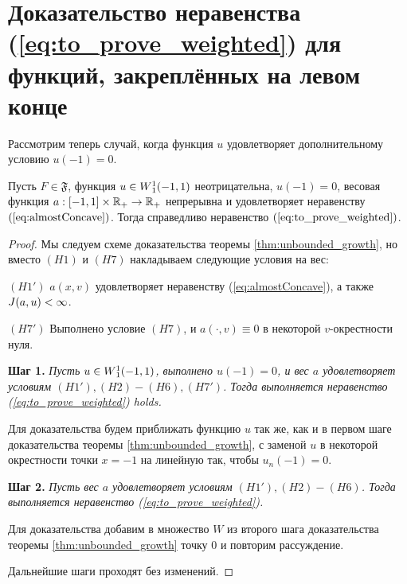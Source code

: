 \section{Доказательство неравенства (\ref{eq:to_prove_weighted}) для функций, закреплённых на левом конце}

Рассмотрим теперь случай, когда функция $u$ удовлетворяет дополнительному условию $u(-1) = 0$.
\begin{thm}
Пусть $F \in \mathfrak{F}$, функция $u \in W{}_1^1(-1, 1)$ неотрицательна, $u(-1) = 0$,
весовая функция $a: [-1, 1] \times \mathbb R_+ \to \mathbb R_+$ непрерывна и удовлетворяет неравенству $(\ref{eq:almostConcave})$.
Тогда справедливо неравенство $(\ref{eq:to_prove_weighted})$.
\end{thm}

\begin{proof}
Мы следуем схеме доказательства теоремы \ref{thm:unbounded_growth},
но вместо $(H1)$ и $(H7)$ накладываем следующие условия на вес:

\bigskip
\noindent
$(H1')$ $a(x, v)$ удовлетворяет неравенству (\ref{eq:almostConcave}), а также $J(a, u) < \infty$.

\bigskip
\noindent
$(H7')$ Выполнено условие $(H7)$, и $a(\cdot, v) \equiv 0$ в некоторой $v$-окрестности нуля.

\bigskip
\textbf{Шаг 1.}
\textit{Пусть $u \in W{}_1^1(-1, 1)$, выполнено $u(-1) = 0$, и вес $a$ удовлетворяет условиям $(H1'), (H2)-(H6), (H7')$.
Тогда выполняется неравенство (\ref{eq:to_prove_weighted}) holds.}

Для доказательства будем приближать функцию $u$ так же, как и в первом шаге доказательства теоремы \ref{thm:unbounded_growth},
с заменой $u$ в некоторой окрестности точки $x = -1$ на линейную так, чтобы $u_n(-1) = 0$.

\bigskip
\textbf{Шаг 2.}
\textit{Пусть вес $a$ удовлетворяет условиям $(H1'), (H2)-(H6)$.
Тогда выполняется неравенство (\ref{eq:to_prove_weighted}).}

Для доказательства добавим в множество $W$ из второго шага доказательства теоремы \ref{thm:unbounded_growth} точку $0$
и повторим рассуждение.

\medskip

Дальнейшие шаги проходят без изменений.
\end{proof}
